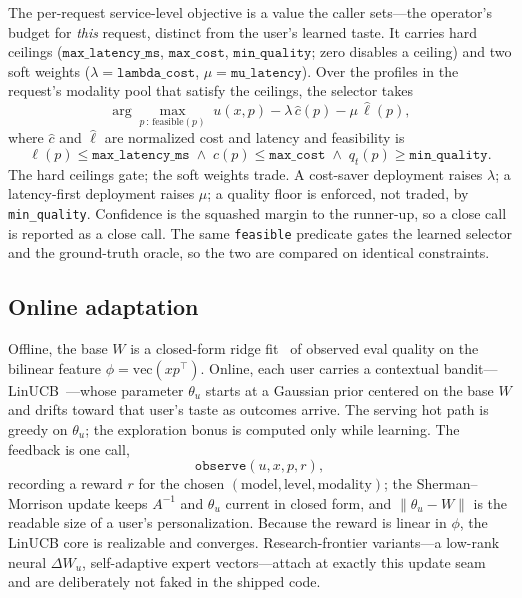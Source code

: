 \documentclass[11pt]{article}
\begin{document}
The per-request service-level objective is a value the caller sets---the
operator's budget for \emph{this} request, distinct from the user's learned
taste. It carries hard ceilings ($\texttt{max\_latency\_ms}$,
$\texttt{max\_cost}$, $\texttt{min\_quality}$; zero disables a ceiling) and two
soft weights ($\lambda=\texttt{lambda\_cost}$, $\mu=\texttt{mu\_latency}$). Over
the profiles in the request's modality pool that satisfy the ceilings, the
selector takes
\begin{equation}
\arg\max_{p\,:\,\text{feasible}(p)}\; u(x,p) - \lambda\,\widehat{c}(p) - \mu\,\widehat{\ell}(p),
\end{equation}
where $\widehat{c}$ and $\widehat{\ell}$ are normalized cost and latency and
feasibility is
\begin{equation}
\ell(p)\le \texttt{max\_latency\_ms}\;\wedge\; c(p)\le \texttt{max\_cost}\;\wedge\; q_t(p)\ge \texttt{min\_quality}.
\end{equation}
The hard ceilings gate; the soft weights trade. A cost-saver deployment raises
$\lambda$; a latency-first deployment raises $\mu$; a quality floor is enforced,
not traded, by \texttt{min\_quality}. Confidence is the squashed margin to the
runner-up, so a close call is reported as a close call. The same
\texttt{feasible} predicate gates the learned selector and the ground-truth
oracle, so the two are compared on identical constraints.

\subsection{Online adaptation}

Offline, the base $W$ is a closed-form ridge fit~\cite{ridge} of observed eval
quality on the bilinear feature $\phi=\mathrm{vec}(xp^{\top})$. Online, each user
carries a contextual bandit---LinUCB~\cite{linucb}---whose parameter
$\theta_u$ starts at a Gaussian prior centered on the base $W$ and drifts toward
that user's taste as outcomes arrive. The serving hot path is greedy on
$\theta_u$; the exploration bonus is computed only while learning. The feedback
is one call,
\begin{equation}
\texttt{observe}(u, x, p, r),
\end{equation}
recording a reward $r$ for the chosen $(\text{model},\text{level},\text{modality})$;
the Sherman--Morrison update keeps $A^{-1}$ and $\theta_u$ current in
closed form, and $\lVert\theta_u - W\rVert$ is the readable size of a user's
personalization. Because the reward is linear in $\phi$, the LinUCB core is
realizable and converges. Research-frontier variants---a low-rank neural
$\Delta W_u$, self-adaptive expert vectors---attach at exactly this update seam
and are deliberately not faked in the shipped code.
\end{document}
